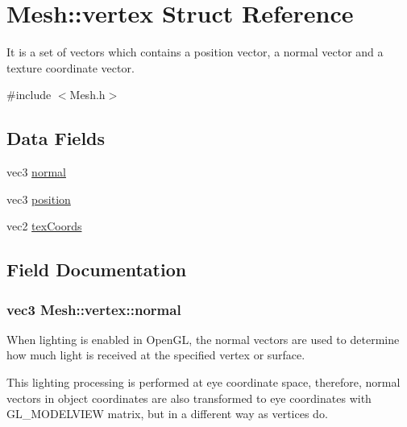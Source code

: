 \hypertarget{structMesh_1_1vertex}{}\section{Mesh\+:\+:vertex Struct Reference}
\label{structMesh_1_1vertex}


It is a set of vectors which contains a position vector, a normal vector and a texture coordinate vector.  




{\ttfamily \#include $<$Mesh.\+h$>$}

\subsection*{Data Fields}
\begin{DoxyCompactItemize}
\item 
vec3 \hyperlink{structMesh_1_1vertex_a680fbbb01fb5382bc43b6553040f5559}{normal}
\item 
vec3 \hyperlink{structMesh_1_1vertex_a2c2b574a9ecd906c361da07eaf124c5d}{position}
\item 
vec2 \hyperlink{structMesh_1_1vertex_a62bc25534c13023dc785c8a45d8432c6}{tex\+Coords}
\end{DoxyCompactItemize}


\subsection{Field Documentation}
\subsubsection[{\texorpdfstring{normal}{normal}}]{\setlength{\rightskip}{0pt plus 5cm}vec3 Mesh\+::vertex\+::normal}\hypertarget{structMesh_1_1vertex_a680fbbb01fb5382bc43b6553040f5559}{}\label{structMesh_1_1vertex_a680fbbb01fb5382bc43b6553040f5559}
When lighting is enabled in Open\+GL, the normal vectors are used to determine how much light is received at the specified vertex or surface.

This lighting processing is performed at eye coordinate space, therefore, normal vectors in object coordinates are also transformed to eye coordinates with G\+L\+\_\+\+M\+O\+D\+E\+L\+V\+I\+EW matrix, but in a different way as vertices do. 
